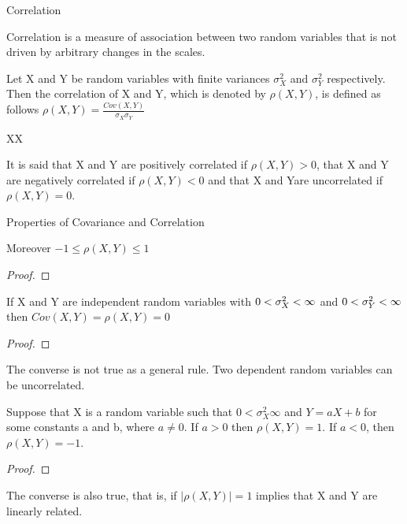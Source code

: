 Correlation

Correlation is a measure of association between two random variables that is not driven by arbitrary changes in the scales.

\begin{definition}
Let X and Y be random variables with finite variances $\sigma_{X}^{2}$ and $\sigma_{Y}^{2}$ respectively. Then the correlation of X and Y, which is denoted by $\rho\left(X,Y\right)$, is defined as follows $\rho\left(X,Y\right)=\frac{Cov\left(X,Y\right)}{\sigma_{X}\sigma_{Y}}$
\end{definition}

XX

\begin{definition}
It is said that X and Y are positively correlated if $\rho\left(X,Y\right)>0$, that X and Y are negatively correlated if $\rho\left(X,Y\right)<0$ and that X and Yare uncorrelated if $\rho\left(X,Y\right)=0$.
\end{definition}

Properties of Covariance and Correlation

\begin{proposition}
Moreover $-1 \leq \rho\left(X,Y\right) \leq 1$
\end{proposition}
\begin{proof}
\end{proof}

\begin{proposition}
If X and Y are independent random variables with $0<\text{\ensuremath{\sigma_{X}^{2}}}<\infty$ and $0<\text{\ensuremath{\sigma_{Y}^{2}}}<\infty$ then $Cov\left(X,Y\right)=\rho\left(X,Y\right)=0$
\end{proposition}
\begin{proof}
\end{proof}

The converse is not true as a general rule. Two dependent random variables can be uncorrelated.

\begin{proposition}
Suppose that X is a random variable such that $0<\sigma_{X}^{2}\infty$ and $Y=aX+b$ for some constants a and b, where $a\neq0$. If $a>0$ then $\rho\left(X,Y\right)=1$. If $a<0$, then $\rho\left(X,Y\right)=-1$.
\end{proposition}
\begin{proof}
\end{proof}

The converse is also true, that is, if $\left|\rho\left(X,Y\right)\right|=1$ implies that X and Y are linearly related.

